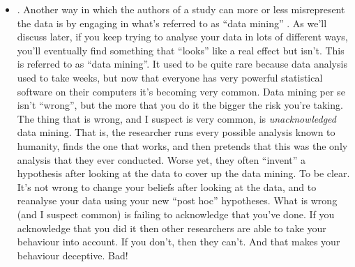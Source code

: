 \begin{itemize}
\item {}. Another way in which the authors of a study can more or less misrepresent the data is by engaging in what's referred to as ``data mining'' \parencite[see][for a broader discussion of this as part of the ``garden of forking paths'' in statistical analysis]{Gelman2014}. As we'll discuss later, if you keep trying to analyse your data in lots of different ways, you'll eventually find something that ``looks'' like a real effect but isn't. This is referred to as ``data mining''. It used to be quite rare because data analysis used to take weeks, but now that everyone has very powerful statistical software on their computers it's becoming very common. Data mining per se isn't ``wrong'', but the more that you do it the bigger the risk you're taking. The thing that is wrong, and I suspect is very common, is {\it unacknowledged} data mining. That is, the researcher runs every possible analysis known to humanity, finds the one that works, and then pretends that this was the only analysis that they ever conducted. Worse yet, they often ``invent'' a hypothesis after looking at the data to cover up the data mining. To be clear. It's not wrong to change your beliefs after looking at the data, and to reanalyse your data using your new ``post hoc'' hypotheses. What is wrong (and I suspect common) is failing to acknowledge that you've done. If you acknowledge that you did it then other researchers are able to take your behaviour into account. If you don't, then they can't. And that makes your behaviour deceptive. Bad! 

\end{itemize}
